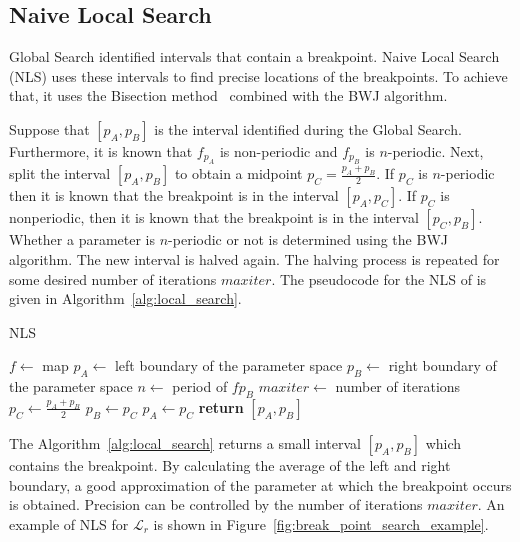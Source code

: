 \subsection{Naive Local Search}
\label{subsec:naive_local_search}

Global Search identified intervals that contain a breakpoint.
Naive Local Search (NLS) uses these intervals to find precise locations of the breakpoints.
To achieve that, it uses the Bisection method~\cite{Burden2015-lp} combined with the BWJ algorithm.
\par
Suppose that $[p_{A}, p_{B}]$ is the interval identified during the Global Search.
Furthermore, it is known that $f_{p_{A}}$ is non-periodic and $f_{p_{B}}$ is $n$-periodic.
Next, split the interval $[p_{A}, p_{B}]$ to obtain a midpoint $p_{C} = \frac{p_{A}+p_{B}}{2}$.
If $p_{C}$ is $n$-periodic then it is known that the breakpoint is in the interval $[p_{A}, p_{C}]$.
If $p_{C}$ is nonperiodic, then it is known that the breakpoint is in the interval $[p_{C}, p_{B}]$.
Whether a parameter is $n$-periodic or not is determined using the BWJ algorithm.
The new interval is halved again.
The halving process is repeated for some desired number of iterations $maxiter$.
The pseudocode for the NLS of is given in Algorithm~\ref{alg:local_search}.

\begin{algorithm}[!h]
    \caption{NLS}
    \label{alg:local_search}
    \begin{algorithmic}[1]
        \Statex $f \gets$ map
        \Statex $p_{A} \gets$ left boundary of the parameter space
        \Statex $p_{B} \gets$ right boundary of the parameter space
        \Statex $n \gets$ period of $f{p_{B}}$
        \Statex $maxiter \gets$ number of iterations
            \State $p_{C} \gets \frac{p_{A}+p_{B}}{2}$
                \State $p_{B} \gets p_{C}$
            \Else
                \State $p_{A} \gets p_{C}$
            \EndIf
        \EndFor
        \State \textbf{return} $[p_{A}, p_{B}]$
    \end{algorithmic}
\end{algorithm}

\par
The Algorithm~\ref{alg:local_search} returns a small interval $[p_{A}, p_{B}]$ which contains the breakpoint.
By calculating the average of the left and right boundary, a good approximation of the parameter at which the breakpoint occurs is obtained.
Precision can be controlled by the number of iterations $maxiter$.
An example of NLS for $\mathcal{L}_{r}$ is shown in Figure~\ref{fig:break_point_search_example}.

